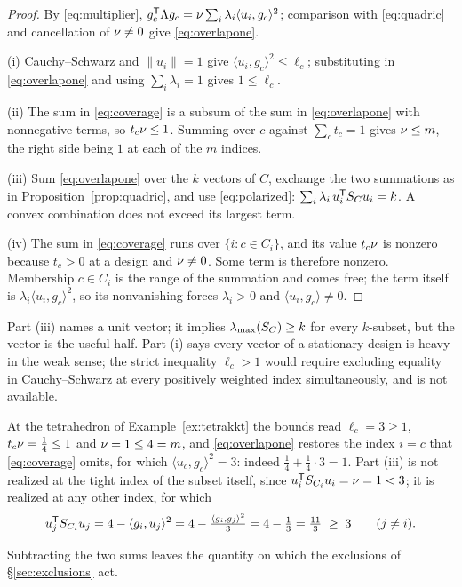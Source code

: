 \begin{proof}
By \eqref{eq:multiplier},
$g_c^{\mathsf{T}}\Lambda g_c=\nu\sum_i\lambda_i\langle u_i,g_c\rangle^2$; comparison
with \eqref{eq:quadric} and cancellation of $\nu\ne0$ give
\eqref{eq:overlapone}.

(i) Cauchy--Schwarz and $\lVert u_i\rVert=1$ give
$\langle u_i,g_c\rangle^2\le\ell_c$; substituting in
\eqref{eq:overlapone} and using $\sum_i\lambda_i=1$ gives $1\le\ell_c$.

(ii) The sum in \eqref{eq:coverage} is a subsum of the sum in
\eqref{eq:overlapone} with nonnegative terms, so $t_c\nu\le1$.  Summing
over $c$ against $\sum_ct_c=1$ gives $\nu\le m$, the right side being $1$
at each of the $m$ indices.

(iii) Sum \eqref{eq:overlapone} over the $k$ vectors of $C$, exchange the
two summations as in Proposition~\ref{prop:quadric}, and use
\eqref{eq:polarized}: $\sum_i\lambda_i\,u_i^{\mathsf{T}}S_{C} u_i=k$.  A convex
combination does not exceed its largest term.

(iv) The sum in \eqref{eq:coverage} runs over $\{i:c\in C_i\}$, and its
value $t_c\nu$ is nonzero because $t_c>0$ at a design and $\nu\ne0$.  Some
term is therefore nonzero.  Membership $c\in C_i$ is the range of the
summation and comes free; the term itself is
$\lambda_i\langle u_i,g_c\rangle^2$, so its nonvanishing forces
$\lambda_i>0$ and $\langle u_i,g_c\rangle\ne0$.
\end{proof}

Part (iii) names a unit vector; it implies $\lambda_{\max}(S_{C})\ge k$ for every
$k$-subset, but the vector is the useful half.  Part (i) says every
vector of a stationary design is heavy in the weak sense; the strict
inequality $\ell_c>1$ would require
excluding equality in Cauchy--Schwarz at every positively weighted index
simultaneously, and is not available.

At the tetrahedron of Example~\ref{ex:tetrakkt} the bounds read
$\ell_c=3\ge1$, $t_c\nu=\tfrac14\le1$ and $\nu=1\le4=m$, and
\eqref{eq:overlapone} restores the index $i=c$ that \eqref{eq:coverage}
omits, for which $\langle u_c,g_c\rangle^2=3$: indeed
$\tfrac14+\tfrac14\cdot3=1$.  Part (iii) is not realized at the tight
index of the subset itself, since $u_i^{\mathsf{T}} S_{C_i}u_i=\nu=1<3$; it is
realized at any other index, for which
\[
  u_j^{\mathsf{T}} S_{C_i}u_j=4-\langle g_i,u_j\rangle^2
   =4-\tfrac{\langle g_i,g_j\rangle^2}{3}=4-\tfrac13=\tfrac{11}3\;\ge\;3
   \qquad(j\ne i).
\]

Subtracting the two sums leaves the quantity on which the exclusions of
\S\ref{sec:exclusions} act.

